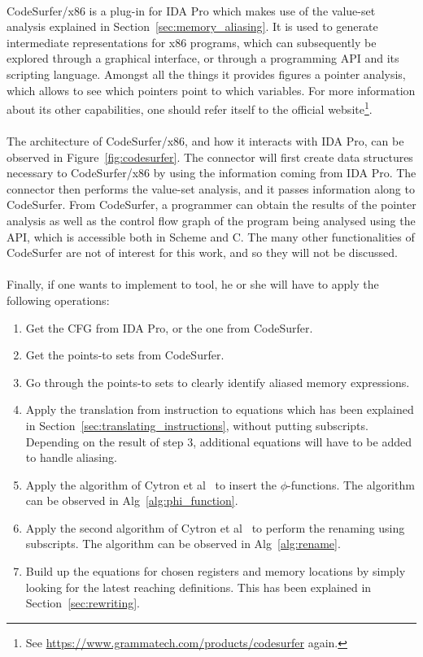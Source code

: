 \paragraph{}
CodeSurfer/x86 is a plug-in for IDA Pro which makes use of the value-set analysis explained in Section~\ref{sec:memory_aliasing}. It is used to generate intermediate representations for x86 programs, which can subsequently be explored through a graphical interface, or through a programming API and its scripting language. Amongst all the things it provides figures a pointer analysis, which allows to see which pointers point to which variables. For more information about its other capabilities, one should refer itself to the official website\footnote{See \url{https://www.grammatech.com/products/codesurfer} again.}. 

\paragraph{}
The architecture of CodeSurfer/x86, and how it interacts with IDA Pro, can be observed in Figure~\ref{fig:codesurfer}. The connector will first create data structures necessary to CodeSurfer/x86 by using the information coming from IDA Pro. The connector then performs the value-set analysis, and it passes information along to CodeSurfer. From CodeSurfer, a programmer can obtain the results of the pointer analysis as well as the control flow graph of the program being analysed using the API, which is accessible both in Scheme and C. The many other functionalities of CodeSurfer are not of interest for this work, and so they will not be discussed. 

\paragraph{}
Finally, if one wants to implement to tool, he or she will have to apply the following operations:
\begin{enumerate}
	\item Get the CFG from IDA Pro, or the one from CodeSurfer.
	\item Get the points-to sets from CodeSurfer.
	\item Go through the points-to sets to clearly identify aliased memory expressions.
	\item Apply the translation from instruction to equations which has been explained in Section~\ref{sec:translating_instructions}, without putting subscripts. Depending on the result of step $3$, additional equations will have to be added to handle aliasing.
	\item Apply the algorithm of Cytron et al~\cite{cytron1991efficiently} to insert the $\phi$-functions. The algorithm can be observed in Alg~\ref{alg:phi_function}.
	\item Apply the second algorithm of Cytron et al~\cite{cytron1991efficiently} to perform the renaming using subscripts. The algorithm can be observed in Alg~\ref{alg:rename}.
	\item Build up the equations for chosen registers and memory locations by simply looking for the latest reaching definitions. This has been explained in Section~\ref{sec:rewriting}.
\end{enumerate}

